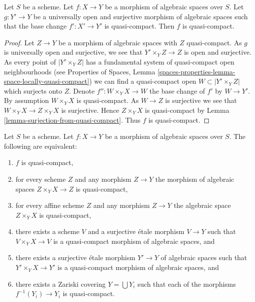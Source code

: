 \begin{lemma}
\label{lemma-descent-quasi-compact}
Let $S$ be a scheme.
Let $f : X \to Y$ be a morphism of algebraic spaces over $S$.
Let $g : Y' \to Y$ be a universally open and surjective morphism of
algebraic spaces such that the base change $f' : X' \to Y'$ is quasi-compact.
Then $f$ is quasi-compact.
\end{lemma}

\begin{proof}
Let $Z \to Y$ be a morphism of algebraic spaces with $Z$ quasi-compact.
As $g$ is universally open and surjective, we see that
$Y' \times_Y Z \to Z$ is open and surjective. As every point of
$|Y' \times_Y Z|$ has a fundamental system of quasi-compact open
neighbourhoods (see
Properties of Spaces,
Lemma \ref{spaces-properties-lemma-space-locally-quasi-compact})
we can find a quasi-compact open $W \subset |Y' \times_Y Z|$
which surjects onto $Z$. Denote
$f'' : W \times_Y X \to W$ the base change of $f'$ by $W \to Y'$.
By assumption $W \times_Y X$ is quasi-compact. As $W \to Z$ is surjective
we see that $W \times_Y X \to Z \times_Y X$ is surjective.
Hence $Z \times_Y X$ is quasi-compact by
Lemma \ref{lemma-surjection-from-quasi-compact}.
Thus $f$ is quasi-compact.
\end{proof}

\begin{lemma}
\label{lemma-quasi-compact-local}
Let $S$ be a scheme.
Let $f : X \to Y$ be a morphism of algebraic spaces over $S$.
The following are equivalent:
\begin{enumerate}
\item $f$ is quasi-compact,
\item for every scheme $Z$ and any morphism $Z \to Y$ the morphism of
algebraic spaces $Z \times_Y X \to Z$ is quasi-compact,
\item for every affine scheme $Z$ and any morphism
$Z \to Y$ the algebraic space $Z \times_Y X$ is quasi-compact,
\item there exists a scheme $V$ and a surjective \'etale morphism
$V \to Y$ such that $V \times_Y X \to V$ is a quasi-compact morphism
of algebraic spaces, and
\item there exists a surjective \'etale morphism
$Y' \to Y$ of algebraic spaces such that $Y' \times_Y X \to Y'$
is a quasi-compact morphism of algebraic spaces, and
\item there exists a Zariski covering $Y = \bigcup Y_i$ such that
each of the morphisms $f^{-1}(Y_i) \to Y_i$ is quasi-compact.
\end{enumerate}
\end{lemma}

